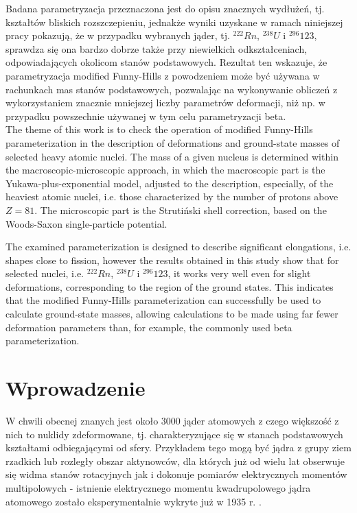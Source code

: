 \documentclass[a4paper,polish]{article}
\numberwithin{equation}{section}
\begin{document}
Badana parametryzacja przeznaczona jest do opisu znacznych wydłużeń, tj. kształtów bliskich rozszczepieniu, jednakże wyniki uzyskane w ramach niniejszej pracy pokazują, że w przypadku wybranych jąder, tj. $^{222}Rn$, $^{238}U$ i $^{296}123$, sprawdza się ona bardzo dobrze także przy niewielkich odkształceniach, odpowiadających okolicom stanów podstawowych. Rezultat ten wskazuje, że parametryzacja modified Funny-Hills z powodzeniem może być używana w rachunkach mas stanów podstawowych, pozwalając na wykonywanie obliczeń z wykorzystaniem znacznie mniejszej liczby parametrów deformacji, niż np. w przypadku powszechnie używanej w tym celu parametryzacji beta.
\\

The theme of this work is to check the operation of modified Funny-Hills parameterization in the description of deformations and ground-state masses of selected heavy atomic nuclei. The mass of a given nucleus is determined within the macroscopic-microscopic approach, in which the macroscopic part is the Yukawa-plus-exponential model, adjusted to the description, especially, of the heaviest atomic nuclei, i.e. those characterized by the number of protons above $Z=81$. The microscopic part is the Strutiński shell correction, based on the Woods-Saxon single-particle potential.

The examined parameterization is designed to describe significant elongations, i.e. shapes close to fission, however the results obtained in this study show that for selected nuclei, i.e. $^{222}Rn$, $^{238}U$ i $^{296}123$, it works very well even for slight deformations, corresponding to the region of the ground states. This indicates that the modified Funny-Hills parameterization can successfully be used to calculate ground-state masses, allowing calculations to be made using far fewer deformation parameters than, for example, the commonly used beta parameterization.


\clearpage
\section{Wprowadzenie}

W chwili obecnej znanych jest około 3000 jąder atomowych z czego większość z nich to nuklidy zdeformowane, tj. charakteryzujące się w stanach podstawowych kształtami odbiegającymi od sfery. Przykładem tego mogą być jądra z grupy ziem rzadkich lub rozległy obszar aktynowców, dla których już od wielu lat obserwuje się widma stanów rotacyjnych  jak i dokonuje pomiarów elektrycznych momentów multipolowych - istnienie elektrycznego momentu kwadrupolowego jądra atomowego zostało eksperymentalnie wykryte już w 1935 r. \cite{1935}.
\end{document}
